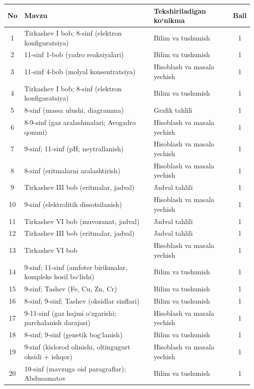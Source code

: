 \documentclass[11pt,a4paper]{article}
\begin{document}
{\small\noindent\begin{longtable}{|c|p{7.2cm}|p{5.4cm}|c|}\hline \textbf{No} & \textbf{Mavzu} & \textbf{Tekshiriladigan ko`nikma} & \textbf{Ball}\\\hline
1 & Tirkashev I bob; 8-sinf (elektron konfiguratsiya) & Bilim va tushunish & 1\\\hline
2 & 11-sinf 1-bob (yadro reaksiyalari) & Bilim va tushunish & 1\\\hline
3 & 11-sinf 4-bob (molyal konsentratsiya) & Hisoblash va masala yechish & 1\\\hline
4 & Tirkashev I bob; 8-sinf (elektron konfiguratsiya) & Bilim va tushunish & 1\\\hline
5 & 8-sinf (massa ulushi, diagramma) & Grafik tahlili & 1\\\hline
6 & 8-9-sinf (gaz aralashmalari; Avogadro qonuni) & Hisoblash va masala yechish & 1\\\hline
7 & 9-sinf; 11-sinf (pH; neytrallanish) & Hisoblash va masala yechish & 1\\\hline
8 & 8-sinf (eritmalarni aralashtirish) & Hisoblash va masala yechish & 1\\\hline
9 & Tirkashev III bob (eritmalar, jadval) & Jadval tahlili & 1\\\hline
10 & 9-sinf (elektrolitik dissotsilanish) & Hisoblash va masala yechish & 1\\\hline
11 & Tirkashev VI bob (muvozanat, jadval) & Jadval tahlili & 1\\\hline
12 & Tirkashev III bob (eritmalar, jadval) & Jadval tahlili & 1\\\hline
13 & Tirkashev VI bob & Hisoblash va masala yechish & 1\\\hline
14 & 9-sinf; 11-sinf (amfoter birikmalar, kompleks hosil bo`lishi) & Bilim va tushunish & 1\\\hline
15 & 9-sinf; Tashev (Fe, Cu, Zn, Cr) & Bilim va tushunish & 1\\\hline
16 & 8-sinf; 9-sinf; Tashev (oksidlar sinflari) & Bilim va tushunish & 1\\\hline
17 & 9-11-sinf (gaz hajmi o`zgarishi; parchalanish darajasi) & Hisoblash va masala yechish & 1\\\hline
18 & 8-sinf; 9-sinf (genetik bog`lanish) & Bilim va tushunish & 1\\\hline
19 & 9-sinf (kislorod olinishi, oltingugurt oksidi + ishqor) & Hisoblash va masala yechish & 1\\\hline
20 & 10-sinf (mavzuga oid paragraflar); Abdusamatov & Bilim va tushunish & 1\\\hline

\end{longtable}}
\end{document}
